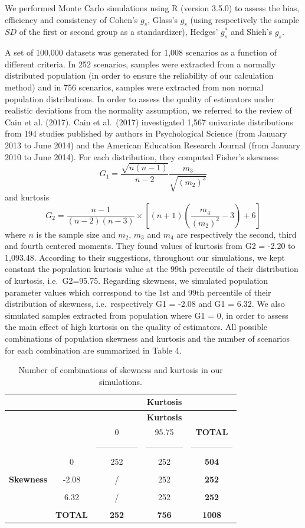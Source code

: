 \documentclass[
  english,
  man,floatsintext]{apa6}
\begin{document}
We performed Monte Carlo simulations using R (version 3.5.0) to assess the bias, efficiency and consistency of Cohen's \(g_s\), Glass's \(g_s\) (using respectively the sample \(SD\) of the first or second group as a standardizer), Hedges' \(g^*_s\) and Shieh's \(g_s\).

A set of 100,000 datasets was generated for 1,008 scenarios as a function of different criteria. In 252 scenarios, samples were extracted from a normally distributed population (in order to ensure the reliability of our calculation method) and in 756 scenarios, samples were extracted from non normal population distributions. In order to assess the quality of estimators under realistic deviations from the normality assumption, we referred to the review of Cain et al. (2017). Cain et al.~(2017) investigated 1,567 univariate distributions from 194 studies published by authors in Psychological Science (from January 2013 to June 2014) and the American Education Research Journal (from January 2010 to June 2014). For each distribution, they computed Fisher's skewness
\[G_{1}=\frac{\sqrt{n(n-1)}}{n-2} \frac{m_{3}}{\sqrt{(m_{2})^3}}\]
and kurtosis \[G_{2}=\frac{n-1}{(n-2)(n-3)}\times \left[(n+1)\left(\frac{m_{4}}{(m_{2})^2}-3\right)+6\right]\]
where \(n\) is the sample size and \(m_{2}\), \(m_{3}\) and \(m_{4}\) are respectively the second, third and fourth centered moments. They found values of kurtosis from G2 = -2.20 to 1,093.48. According to their suggestions, throughout our simulations, we kept constant the population kurtosis value at the 99th percentile of their distribution of kurtosis, i.e.~G2=95.75. Regarding skewness, we simulated population parameter values which correspond to the 1st and 99th percentile of their distribution of skewness, i.e.~respectively G1 = -2.08 and G1 = 6.32. We also simulated samples extracted from population where G1 = 0, in order to assess the main effect of high kurtosis on the quality of estimators. All possible combinations of population skewness and kurtosis and the number of scenarios for each combination are summarized in Table 4.

\begin{longtable}[]{@{}ccccc@{}}
\caption{Number of combinations of skewness and kurtosis in our simulations.}\tabularnewline
\toprule
& & & \textbf{Kurtosis} &\tabularnewline
\midrule
\endfirsthead
\toprule
& & & \textbf{Kurtosis} &\tabularnewline
\midrule
\endhead
& & 0 & 95.75 & \textbf{TOTAL}\tabularnewline
& & --------------- & -------------- & ---------------\tabularnewline
& 0 & 252 & 252 & \textbf{504}\tabularnewline
& & & &\tabularnewline
\textbf{Skewness} & -2.08 & / & 252 & \textbf{252}\tabularnewline
& & & &\tabularnewline
& 6.32 & / & 252 & \textbf{252}\tabularnewline
& & & &\tabularnewline
& \textbf{TOTAL} & \textbf{252} & \textbf{756} & \textbf{1008}\tabularnewline
\bottomrule
\end{longtable}
\end{document}
